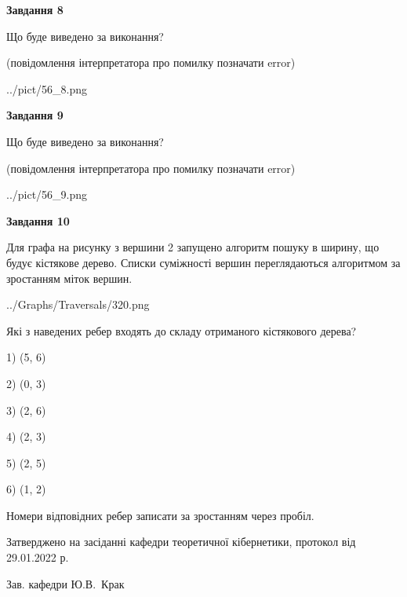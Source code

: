 \documentclass[12pt, ukrainian]{article}
\begin{document}
{\begin {large}
{\begin {center}\textbf{Завдання 8}\end {center}}\par
Що буде виведено за виконання?\par
 (повідомлення інтерпретатора про помилку позначати error)\par
\begin{center}
	{../pict/56_8.png}
\end{center}
\newpage

{\begin {center}\textbf{Завдання 9}\end {center}}\par
Що буде виведено за виконання?\par
 (повідомлення інтерпретатора про помилку позначати error)\par
\begin{center}
	{../pict/56_9.png}
\end{center}
\newpage

{\begin {center}\textbf{Завдання 10}\end {center}}\par
Для графа на рисунку з вершини 2 запущено алгоритм пошуку в ширину, що будує кістякове дерево. Списки суміжності вершин переглядаються алгоритмом за зростанням міток вершин.\par
\begin{center}
	{../Graphs/Traversals/320.png}
\end{center}
\par Які з наведених ребер входять до складу отриманого кістякового дерева?\par
1) (5, 6)\par
2) (0, 3)\par
3) (2, 6)\par
4) (2, 3)\par
5) (2, 5)\par
6) (1, 2)\par
{\vskip 15pt} Номери відповідних ребер записати за зростанням через пробіл.\par
\newpage


\end {large}
}
{\smallskip \begin {small} Затверджено на засіданні кафедри теоретичної кібернетики, протокол  від   29.01.2022 р.\par\smallskip\smallskip
{\parbox {6.5 cm}{Зав. кафедри \dotfill Ю.В.~Крак}} \end{small}}
\end{document}
